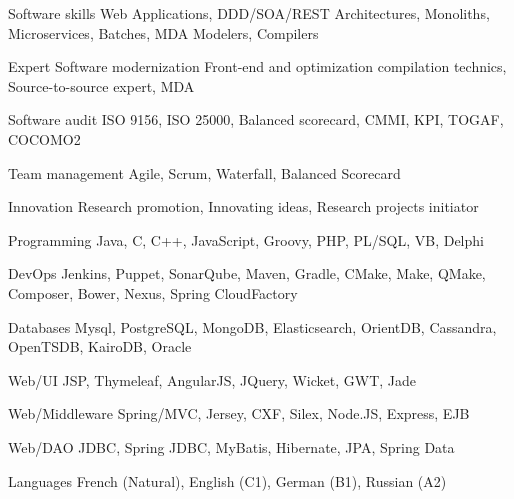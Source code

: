 

\begin{cvskills}

  \cvskill
  {Software skills} %
  {Web Applications, DDD/SOA/REST Architectures, Monoliths, Microservices, Batches, MDA Modelers, Compilers} %


  \cvskill
  {Expert Software modernization} %
  {Front-end and optimization compilation technics, Source-to-source expert, MDA} %


  \cvskill
  {Software audit} %
  {ISO 9156, ISO 25000, Balanced scorecard, CMMI, KPI, TOGAF, COCOMO2} %

  \cvskill
  {Team management} %
  {Agile, Scrum, Waterfall, Balanced Scorecard} %

  \cvskill
  {Innovation} %
  {Research promotion, Innovating ideas, Research projects initiator} %

  \cvskill
  {Programming} %
  {Java, C, C++, JavaScript, Groovy, PHP, PL/SQL, VB, Delphi} %
  
  \cvskill
  {DevOps} %
  {Jenkins, Puppet, SonarQube, Maven, Gradle, CMake, Make, QMake, Composer, Bower, Nexus, Spring CloudFactory} %
  
  \cvskill
  {Databases} %
  {Mysql, PostgreSQL, MongoDB, Elasticsearch, OrientDB, Cassandra, OpenTSDB, KairoDB, Oracle} %
  
  \cvskill
  {Web/UI} %
  {JSP, Thymeleaf, AngularJS, JQuery, Wicket, GWT, Jade} %
  
  \cvskill
  {Web/Middleware} %
  {Spring/MVC, Jersey, CXF, Silex, Node.JS, Express, EJB} %
  
  
  \cvskill
  {Web/DAO} %
  {JDBC, Spring JDBC, MyBatis, Hibernate, JPA, Spring Data} %
  

  \cvskill
    {Languages} %
    {French (Natural), English (C1), German (B1), Russian (A2)} %

\end{cvskills}
